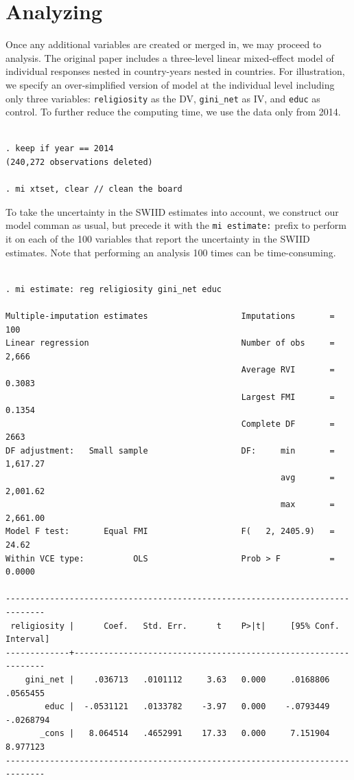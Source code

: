 \documentclass[11pt,]{article}
\theoremstyle{definition}
\theoremstyle{definition}
\theoremstyle{remark}
\begin{document}
\section{Analyzing}\label{analyzing}

Once any additional variables are created or merged in, we may proceed
to analysis. The original paper includes a three-level linear
mixed-effect model of individual responses nested in country-years
nested in countries. For illustration, we specify an over-simplified
version of model at the individual level including only three variables:
\texttt{religiosity} as the DV, \texttt{gini\_net} as IV, and
\texttt{educ} as control. To further reduce the computing time, we use
the data only from 2014.

\begin{verbatim}

. keep if year == 2014
(240,272 observations deleted)

. mi xtset, clear // clean the board
\end{verbatim}

To take the uncertainty in the SWIID estimates into account, we
construct our model comman as usual, but precede it with the
\texttt{mi\ estimate:} prefix to perform it on each of the 100 variables
that report the uncertainty in the SWIID estimates. Note that performing
an analysis 100 times can be time-consuming.

\begin{verbatim}

. mi estimate: reg religiosity gini_net educ

Multiple-imputation estimates                   Imputations       =        100
Linear regression                               Number of obs     =      2,666
                                                Average RVI       =     0.3083
                                                Largest FMI       =     0.1354
                                                Complete DF       =       2663
DF adjustment:   Small sample                   DF:     min       =   1,617.27
                                                        avg       =   2,001.62
                                                        max       =   2,661.00
Model F test:       Equal FMI                   F(   2, 2405.9)   =      24.62
Within VCE type:          OLS                   Prob > F          =     0.0000

------------------------------------------------------------------------------
 religiosity |      Coef.   Std. Err.      t    P>|t|     [95% Conf. Interval]
-------------+----------------------------------------------------------------
    gini_net |    .036713   .0101112     3.63   0.000     .0168806    .0565455
        educ |  -.0531121   .0133782    -3.97   0.000    -.0793449   -.0268794
       _cons |   8.064514   .4652991    17.33   0.000     7.151904    8.977123
------------------------------------------------------------------------------
\end{verbatim}
\end{document}
